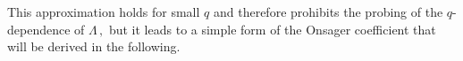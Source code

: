 \documentclass[bachelor,       %
               twoside,        %
               BCOR10mm,       %
               ngerman, english %
               ]{GAUBM}
\begin{document}
This approximation holds for small $q$ and therefore prohibits the probing of the $q$-dependence of $\Lambda\,,$ but it leads to a simple form of the Onsager coefficient that will be derived in the following. 








\end{document}
